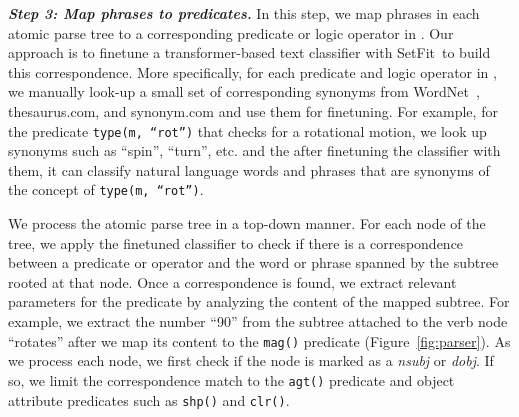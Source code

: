 
\vspace{0.5em}
\noindent
{\bf \em Step 3: Map phrases to \dslname{} predicates.}
In this step, we map phrases in each atomic parse tree to a corresponding predicate or logic operator in \dslname{}.
%
Our approach is to finetune a transformer-based text classifier with SetFit\,\cite{tunstall2022setfit} to build this correspondence.
%
More specifically, for each predicate and logic operator in \dslname{}, we
manually look-up a small set of corresponding synonyms from WordNet~\cite{miller1994wordnet}, thesaurus.com, and synonym.com and use them for finetuning.
%
For example, for the predicate \texttt{type(m, ``rot'')} that checks for a rotational motion, we look up synonyms such as ``spin'', ``turn'', etc. and
the after finetuning the classifier with them, it can classify natural language words and phrases that are synonyms of the concept of \texttt{type(m, ``rot'')}.

We process the atomic parse tree in a top-down manner.
For each node of the tree, we apply the finetuned classifier to check if
there is a correspondence between a \dslname{} predicate or operator and the word or phrase spanned by the subtree rooted at that node.
%
Once a correspondence is found, we extract relevant parameters for the predicate by analyzing the content of the mapped subtree.
For example, we extract the number ``90'' from the subtree attached to the verb node ``rotates'' after we map its content to the \texttt{mag()} predicate (Figure~\ref{fig:parser}).
%
As we process each node, we first check if the node is marked as a \textit{nsubj} or \textit{dobj}.
If so, we limit the correspondence match to the \texttt{agt()}
predicate and object attribute predicates such as \texttt{shp()} and
\texttt{clr()}.

